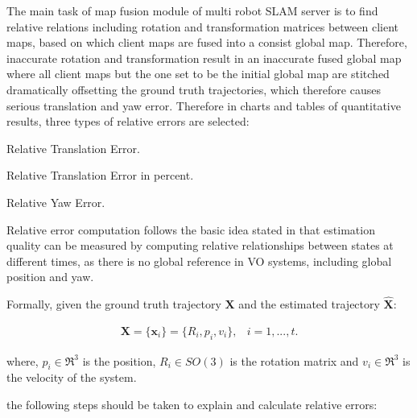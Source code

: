 The main task of map fusion module of multi robot SLAM server is to find relative relations including rotation and transformation matrices between client maps, based on which client maps are fused into a consist global map. Therefore, inaccurate rotation and transformation result in an inaccurate fused global map where all client maps but the one set to be the initial global map are stitched dramatically offsetting the ground truth trajectories, which therefore causes serious translation and yaw error. Therefore in charts and tables of quantitative results, three types of relative errors are selected: 

\begin{inparaenum}
	\item Relative Translation Error.

	\item Relative Translation Error in percent. 
	
	\item Relative Yaw Error.
\end{inparaenum}

Relative error computation follows the basic idea stated in \cite{zhang2018tutorial } that estimation quality can be measured by computing relative relationships between states at different times, as there is no global reference in VO systems, including global position and yaw.

Formally, given the ground truth trajectory ${\bm{X}}$ and the estimated trajectory $\hat{\bm{X}}$:

\begin{equation}
\begin{array}{lr}
{\bm{X}}=\{\bm{x}_{i}\}=\{R_i, p_i, v_i\}, & i=1,...,t.
\end{array}
\end{equation}

where, $p_i\in\Re^3$ is the position, $R_i\in{SO(3)}$ is the rotation matrix and $v_i\in\Re^{3}$ is the velocity of the system. 

 the following steps should be taken to explain and calculate relative errors:

